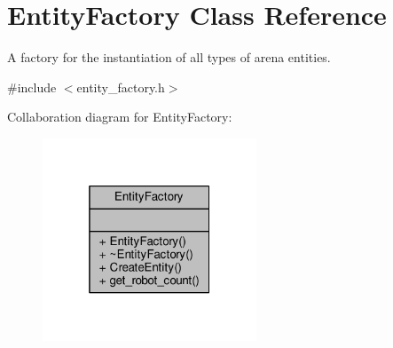 \hypertarget{classEntityFactory}{}\section{Entity\+Factory Class Reference}
\label{classEntityFactory}


A factory for the instantiation of all types of arena entities.  




{\ttfamily \#include $<$entity\+\_\+factory.\+h$>$}



Collaboration diagram for Entity\+Factory\+:\nopagebreak
\begin{figure}[H]
\begin{center}
\leavevmode
\includegraphics[width=181pt]{classEntityFactory__coll__graph}
\end{center}
\end{figure}
